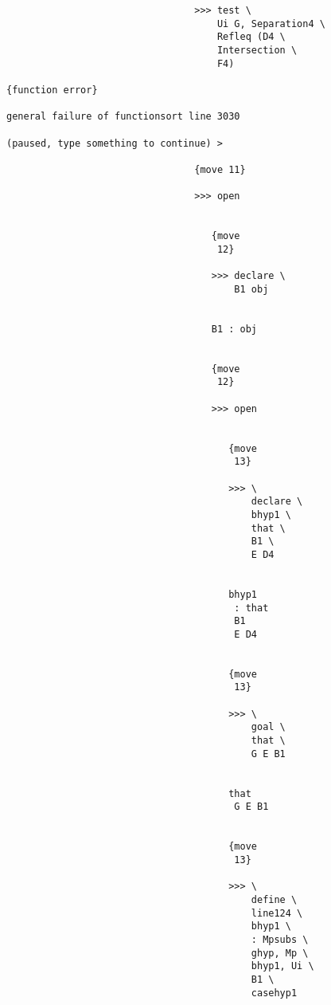 \documentclass[12pt]{article}
\begin{document}
\begin{verbatim}
                                 >>> test \
                                     Ui G, Separation4 \
                                     Refleq (D4 \
                                     Intersection \
                                     F4)

{function error}

general failure of functionsort line 3030

(paused, type something to continue) >

                                 {move 11}

                                 >>> open


                                    {move 
                                     12}

                                    >>> declare \
                                        B1 obj


                                    B1 : obj


                                    {move 
                                     12}

                                    >>> open


                                       {move 
                                        13}

                                       >>> \
                                           declare \
                                           bhyp1 \
                                           that \
                                           B1 \
                                           E D4


                                       bhyp1 
                                        : that 
                                        B1 
                                        E D4


                                       {move 
                                        13}

                                       >>> \
                                           goal \
                                           that \
                                           G E B1


                                       that 
                                        G E B1


                                       {move 
                                        13}

                                       >>> \
                                           define \
                                           line124 \
                                           bhyp1 \
                                           : Mpsubs \
                                           ghyp, Mp \
                                           bhyp1, Ui \
                                           B1 \
                                           casehyp1



\end{verbatim}
\end{document}
